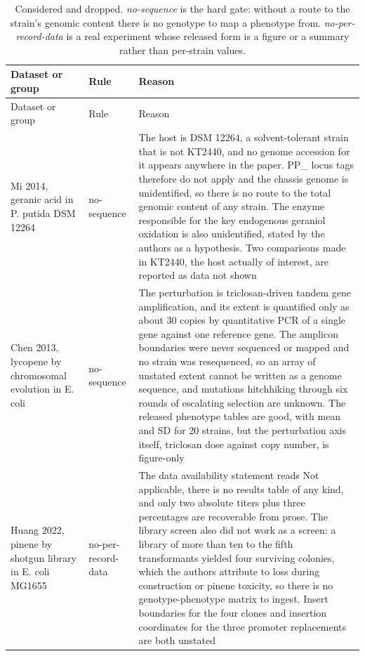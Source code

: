 \begingroup
\footnotesize
\begin{longtable}{@{}L{58mm} L{28mm} L{83mm}@{}}
\caption[]{Considered and dropped. \emph{no-sequence} is the hard gate: without a route
to the strain's genomic content there is no genotype to map a phenotype from.
\emph{no-per-record-data} is a real experiment whose released form is a figure or a
summary rather than per-strain values.}
\label{tab:bexcluded}\\
\toprule
Dataset or group & Rule & Reason \\
\midrule
\endfirsthead
\toprule
Dataset or group & Rule & Reason \\
\midrule
\endhead
\bottomrule
\endfoot
Mi 2014, geranic acid in P. putida DSM 12264 & no-sequence & The host is DSM 12264, a solvent-tolerant strain that is not KT2440, and no genome accession for it appears anywhere in the paper. PP\_ locus tags therefore do not apply and the chassis genome is unidentified, so there is no route to the total genomic content of any strain. The enzyme responsible for the key endogenous geraniol oxidation is also unidentified, stated by the authors as a hypothesis. Two comparisons made in KT2440, the host actually of interest, are reported as data not shown \\
\addlinespace[5pt]
Chen 2013, lycopene by chromosomal evolution in E. coli & no-sequence & The perturbation is triclosan-driven tandem gene amplification, and its extent is quantified only as about 30 copies by quantitative PCR of a single gene against one reference gene. The amplicon boundaries were never sequenced or mapped and no strain was resequenced, so an array of unstated extent cannot be written as a genome sequence, and mutations hitchhiking through six rounds of escalating selection are unknown. The released phenotype tables are good, with mean and SD for 20 strains, but the perturbation axis itself, triclosan dose against copy number, is figure-only \\
\addlinespace[5pt]
Huang 2022, pinene by shotgun library in E. coli MG1655 & no-per-record-data & The data availability statement reads Not applicable, there is no results table of any kind, and only two absolute titers plus three percentages are recoverable from prose. The library screen also did not work as a screen: a library of more than ten to the fifth transformants yielded four surviving colonies, which the authors attribute to loss during construction or pinene toxicity, so there is no genotype-phenotype matrix to ingest. Insert boundaries for the four clones and insertion coordinates for the three promoter replacements are both unstated \\

\end{longtable}
